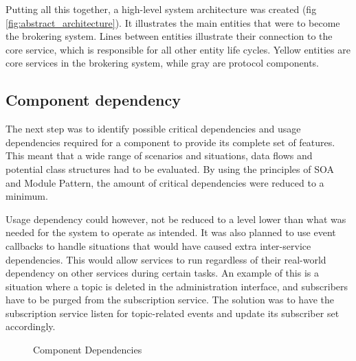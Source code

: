 Putting all this together, a high-level system architecture was created (fig \ref{fig:abstract_architecture}). It illustrates the main entities that were to become the brokering system. Lines between entities illustrate their connection to the core service, which is responsible for all other entity life cycles. Yellow entities are core services in the brokering system, while gray are protocol components.

\subsection{Component dependency}
\label{subsec:architecture_and_implementation-broker_architecture-component_dependency}

The next step was to identify possible critical dependencies and usage dependencies required for a component to provide its complete set of features. This meant that a wide range of scenarios and situations, data flows and potential class structures had to be evaluated. By using the principles of SOA and Module Pattern, the amount of critical dependencies were reduced to a minimum.

Usage dependency could however, not be reduced to a level lower than what was needed for the system to operate as intended. It was also planned to use event callbacks to handle situations that would have caused extra inter-service dependencies. This would allow services to run regardless of their real-world dependency on other services during certain tasks. An example of this is a situation where a topic is deleted in the administration interface, and subscribers have to be purged from the subscription service. The solution was to have the subscription service listen for topic-related events and update its subscriber set accordingly.

\begin{center}
  \begin{figure}[ht!]
    \caption{Component Dependencies}
    \label{fig:architecture_dependency}
  \end{figure}
\end{center}

